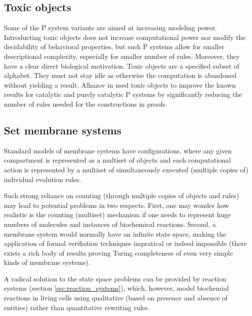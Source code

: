 \subsection{Toxic objects} %
\label{sub:toxic_objects}

Some of the P system variants are aimed at increasing modeling power. Introducting toxic objects \cite{Alhazov14Toxic} does not increase computational power nor modify the decidability of behavioral properties, but such P systems allow for smaller descriptional complexity, especially for smaller number of rules. Moreover, they have a clear direct biological motivation.
Toxic objects are a specified subset of alphabet. They must not stay idle as otherwise the computation is abandoned without yielding a result. 
Alhazov in \cite{Alhazov14Toxic} used toxic objects to improve the known results for catalytic and purely catalytic P systems by significantly reducing the number of rules needed for the constructions in proofs. 


\subsection{Set membrane systems} %
\label{sub:set_membrane_systems}

Standard models of membrane systems have configurations, where any given compartment is represented as a multiset of objects and each computational action is represented by a multiset of simultaneously executed (multiple copies of) individual evolution rules.

Such strong reliance on counting (through multiple copies of objects and rules) may lead to potential problems in two respects. First, one may wonder how realistic is the counting (multiset) mechanism if one needs to represent huge numbers of molecules and instances of biochemical reactions. Second, a membrane system would normally have an infinite state space, making the application
of formal verifiation techniques impratical or indeed impossible (there exists a rich body of results proving Turing completeness of even very simple kinds of membrane systems).

A radical solution to the state space problems can be provided by reaction systems (section \ref{sec:reaction_systems}), which, however, model biochemial reactions in living cells using qualitative (based on presence and absence of entities) rather than quantitative rewriting rules.

